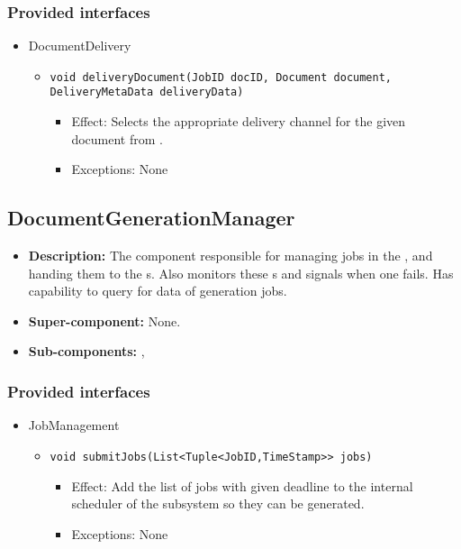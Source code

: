 \subsubsection*{Provided interfaces}
\begin{itemize}
    \item DocumentDelivery
    \begin{itemize}
        \item \texttt{void deliveryDocument(JobID docID, Document document, DeliveryMetaData deliveryData)}
        \begin{itemize}
            \item Effect: Selects the appropriate delivery channel for the given document from .
            \item Exceptions: None
        \end{itemize}
    \end{itemize}
\end{itemize}

\subsection{DocumentGenerationManager}
\begin{itemize}
    \item \textbf{Description:} The component responsible for managing jobs in the , and handing them to the s. Also monitors these s and signals when one fails. Has capability to query for data of generation jobs.
    \item \textbf{Super-component:} None.
    \item \textbf{Sub-components:} , \ttt{}
\end{itemize}

\subsubsection*{Provided interfaces}
\begin{itemize}
    \item JobManagement
    \begin{itemize}
        \item \texttt{void submitJobs(List<Tuple<JobID,TimeStamp>> jobs)}
        \begin{itemize}
            \item Effect: Add the list of jobs with given deadline to the internal scheduler of the subsystem so they can be generated.
            \item Exceptions: None
        \end{itemize}
    \end{itemize}
\end{itemize}

